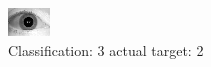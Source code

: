 \begin{figure}[h!]
\begin{center}
\includegraphics[width=0.60\columnwidth]{figures/ID1694_class_3_target_2.png}
\end{center}
\caption{ Classification: 3 actual target: 2}
\label{fig:ID1694_class_3_target_2}
\end{figure}

